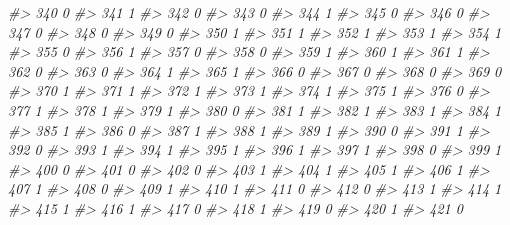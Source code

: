 \documentclass[]{book}
\newenvironment{Shaded}{\begin{snugshade}}{\end{snugshade}}
\newcommand{\CommentTok}[1]{\textcolor[rgb]{0.56,0.35,0.01}{\textit{#1}}}
\begin{document}
\begin{Shaded}
\begin{Highlighting}[]
\CommentTok{#> 340           0}
\CommentTok{#> 341           1}
\CommentTok{#> 342           0}
\CommentTok{#> 343           0}
\CommentTok{#> 344           1}
\CommentTok{#> 345           0}
\CommentTok{#> 346           0}
\CommentTok{#> 347           0}
\CommentTok{#> 348           0}
\CommentTok{#> 349           0}
\CommentTok{#> 350           1}
\CommentTok{#> 351           1}
\CommentTok{#> 352           1}
\CommentTok{#> 353           1}
\CommentTok{#> 354           1}
\CommentTok{#> 355           0}
\CommentTok{#> 356           1}
\CommentTok{#> 357           0}
\CommentTok{#> 358           0}
\CommentTok{#> 359           1}
\CommentTok{#> 360           1}
\CommentTok{#> 361           1}
\CommentTok{#> 362           0}
\CommentTok{#> 363           0}
\CommentTok{#> 364           1}
\CommentTok{#> 365           1}
\CommentTok{#> 366           0}
\CommentTok{#> 367           0}
\CommentTok{#> 368           0}
\CommentTok{#> 369           0}
\CommentTok{#> 370           1}
\CommentTok{#> 371           1}
\CommentTok{#> 372           1}
\CommentTok{#> 373           1}
\CommentTok{#> 374           1}
\CommentTok{#> 375           1}
\CommentTok{#> 376           0}
\CommentTok{#> 377           1}
\CommentTok{#> 378           1}
\CommentTok{#> 379           1}
\CommentTok{#> 380           0}
\CommentTok{#> 381           1}
\CommentTok{#> 382           1}
\CommentTok{#> 383           1}
\CommentTok{#> 384           1}
\CommentTok{#> 385           1}
\CommentTok{#> 386           0}
\CommentTok{#> 387           1}
\CommentTok{#> 388           1}
\CommentTok{#> 389           1}
\CommentTok{#> 390           0}
\CommentTok{#> 391           1}
\CommentTok{#> 392           0}
\CommentTok{#> 393           1}
\CommentTok{#> 394           1}
\CommentTok{#> 395           1}
\CommentTok{#> 396           1}
\CommentTok{#> 397           1}
\CommentTok{#> 398           0}
\CommentTok{#> 399           1}
\CommentTok{#> 400           0}
\CommentTok{#> 401           0}
\CommentTok{#> 402           0}
\CommentTok{#> 403           1}
\CommentTok{#> 404           1}
\CommentTok{#> 405           1}
\CommentTok{#> 406           1}
\CommentTok{#> 407           1}
\CommentTok{#> 408           0}
\CommentTok{#> 409           1}
\CommentTok{#> 410           1}
\CommentTok{#> 411           0}
\CommentTok{#> 412           0}
\CommentTok{#> 413           1}
\CommentTok{#> 414           1}
\CommentTok{#> 415           1}
\CommentTok{#> 416           1}
\CommentTok{#> 417           0}
\CommentTok{#> 418           1}
\CommentTok{#> 419           0}
\CommentTok{#> 420           1}
\CommentTok{#> 421           0}

\end{Highlighting}
\end{Shaded}
\end{document}

